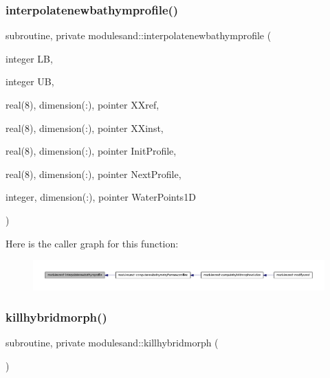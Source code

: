 \subsubsection{\texorpdfstring{interpolatenewbathymprofile()}{interpolatenewbathymprofile()}}
{\footnotesize\ttfamily subroutine, private modulesand\+::interpolatenewbathymprofile (\begin{DoxyParamCaption}\item[{integer}]{LB,  }\item[{integer}]{UB,  }\item[{real(8), dimension(\+:), pointer}]{X\+Xref,  }\item[{real(8), dimension(\+:), pointer}]{X\+Xinst,  }\item[{real(8), dimension(\+:), pointer}]{Init\+Profile,  }\item[{real(8), dimension(\+:), pointer}]{Next\+Profile,  }\item[{integer, dimension(\+:), pointer}]{Water\+Points1D }\end{DoxyParamCaption})\hspace{0.3cm}{\ttfamily [private]}}

Here is the caller graph for this function\+:\nopagebreak
\begin{figure}[H]
\begin{center}
\leavevmode
\includegraphics[width=350pt]{namespacemodulesand_abe7195f0a91ff792f6a36bea021901b1_icgraph}
\end{center}
\end{figure}
\mbox{\label{namespacemodulesand_a213ec97f902c200fd1bb472fe1490e92}} 
\subsubsection{\texorpdfstring{killhybridmorph()}{killhybridmorph()}}
{\footnotesize\ttfamily subroutine, private modulesand\+::killhybridmorph (\begin{DoxyParamCaption}{ }\end{DoxyParamCaption})\hspace{0.3cm}{\ttfamily [private]}}

